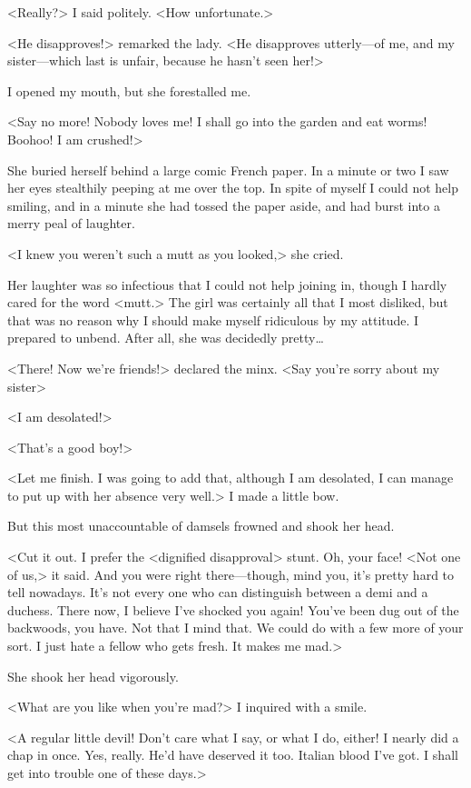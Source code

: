  <Really?> I said politely. <How unfortunate.> 

 <He disapproves!> remarked the lady. <He disapproves utterly—of me, and my sister—which last is unfair, because he hasn't seen her!> 

 I opened my mouth, but she forestalled me. 

 <Say no more! Nobody loves me! I shall go into the garden and eat worms! Boohoo! I am crushed!> 

 She buried herself behind a large comic French paper. In a minute or two I saw her eyes stealthily peeping at me over the top. In spite of myself I could not help smiling, and in a minute she had tossed the paper aside, and had burst into a merry peal of laughter. 

 <I knew you weren't such a mutt as you looked,> she cried. 

 Her laughter was so infectious that I could not help joining in, though I hardly cared for the word <mutt.> The girl was certainly all that I most disliked, but that was no reason why I should make myself ridiculous by my attitude. I prepared to unbend. After all, she was decidedly pretty\dots 

 <There! Now we're friends!> declared the minx. <Say you're sorry about my sister\longdash> 

 <I am desolated!> 

 <That's a good boy!> 

 <Let me finish. I was going to add that, although I am desolated, I can manage to put up with her absence very well.> I made a little bow. 

 But this most unaccountable of damsels frowned and shook her head. 

 <Cut it out. I prefer the <dignified disapproval> stunt. Oh, your face! <Not one of us,> it said. And you were right there—though, mind you, it's pretty hard to tell nowadays. It's not every one who can distinguish between a demi and a duchess. There now, I believe I've shocked you again! You've been dug out of the backwoods, you have. Not that I mind that. We could do with a few more of your sort. I just hate a fellow who gets fresh. It makes me mad.> 

 She shook her head vigorously. 

 <What are you like when you're mad?> I inquired with a smile. 

 <A regular little devil! Don't care what I say, or what I do, either! I nearly did a chap in once. Yes, really. He'd have deserved it too. Italian blood I've got. I shall get into trouble one of these days.> 

